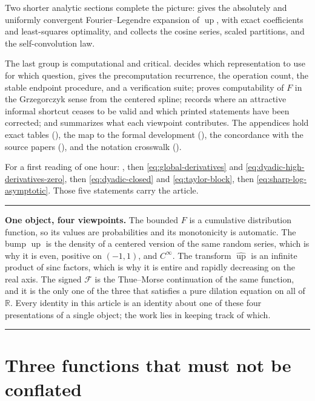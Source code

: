 \documentclass[11pt,oneside]{article}
\theoremstyle{definition}
\theoremstyle{remark}
\newcommand{\R}{\mathbb R}
\newcommand{\Up}{\operatorname{up}}
\newenvironment{boxedremark}{%
  \par\smallskip\noindent\begin{center}\begin{minipage}{0.94\textwidth}%
  \color{black}\hrule\vspace{0.6em}\small
}{%
  \vspace{0.6em}\hrule\end{minipage}\end{center}\smallskip
}
\begin{document}
Two shorter analytic sections complete the picture:  gives the absolutely
and uniformly convergent Fourier--Legendre expansion of $\Up$, with exact coefficients and
least-squares optimality, and  collects the cosine series,
scaled partitions, and the self-convolution law.

The last group is computational and critical.   decides which
representation to use for which question, gives the precomputation recurrence, the operation
count, the stable endpoint procedure, and a verification suite;
 proves computability of $F$ in the Grzegorczyk sense from
the centered spline;  records where an attractive informal shortcut ceases to
be valid and which printed statements have been corrected; and 
summarizes what each viewpoint contributes.  The appendices hold exact tables
(), the map to the formal development (), the
concordance with the source papers (), and the notation crosswalk
().

For a first reading of one hour: , then
\eqref{eq:global-derivatives} and \eqref{eq:dyadic-high-derivatives-zero}, then
\eqref{eq:dyadic-closed} and \eqref{eq:taylor-block}, then
\eqref{eq:sharp-log-asymptotic}.  Those five statements carry the article.

\begin{boxedremark}
\textbf{One object, four viewpoints.}
The bounded $F$ is a cumulative distribution function, so its values are probabilities and
its monotonicity is automatic.  The bump $\Up$ is the density of a centered version of the
same random series, which is why it is even, positive on $(-1,1)$, and $C^\infty$.  The
transform $\widehat{\Up}$ is an infinite product of sinc factors, which is why it is entire
and rapidly decreasing on the real axis.  The signed $\mathcal F$ is the Thue--Morse
continuation of the same function, and it is the only one of the three that satisfies a pure
dilation equation on all of $\R$.  Every identity in this article is an identity about one of
these four presentations of a single object; the work lies in keeping track of which.
\end{boxedremark}

\section{Three functions that must not be conflated}
\label{sec:three-functions}
\end{document}
